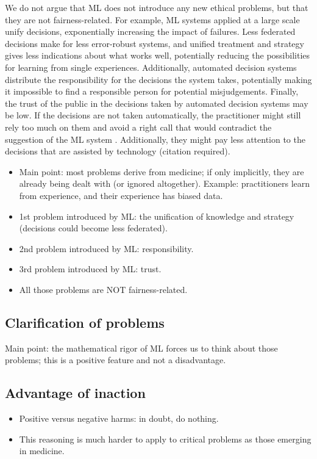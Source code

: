 We do not argue that ML does not introduce any new ethical problems, but that they are not fairness-related.
For example, ML systems applied at a large scale unify decisions, exponentially increasing the impact of failures.
Less federated decisions make for less error-robust systems, and unified treatment and strategy gives less indications about what works well, potentially reducing the possibilities for learning from single experiences.
Additionally, automated decision systems distribute the responsibility for the decisions the system takes, potentially making it impossible to find a responsible person for potential misjudgements.
Finally, the trust of the public in the decisions taken by automated decision systems may be low.
If the decisions are not taken automatically, the practitioner might still rely too much on them and avoid a right call that would contradict the suggestion of the ML system \cite[p.~4]{Morley2020}.
Additionally, they might pay less attention to the decisions that are assisted by technology (citation required).
\begin{itemize}
    \item Main point: most problems derive from medicine;
        if only implicitly, they are already being dealt with (or ignored altogether).
        Example: practitioners learn from experience, and their experience has biased data.
    \item 1st problem introduced by ML: the unification of knowledge and strategy (decisions could become less federated).
    \item 2nd problem introduced by ML: responsibility.
    \item 3rd problem introduced by ML: trust.
    \item All those problems are NOT fairness-related.
\end{itemize}

\subsection{Clarification of problems}
Main point: the mathematical rigor of ML forces us to think about those problems; this is a positive feature and not a disadvantage.

\subsection{Advantage of inaction}
\begin{itemize}
    \item Positive versus negative harms: in doubt, do nothing.
    \item This reasoning is much harder to apply to critical problems as those emerging in medicine.
\end{itemize}
